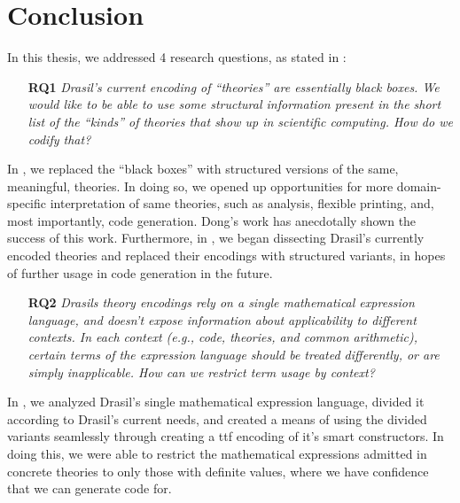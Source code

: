 \chapter{Conclusion}
\label{chap:conclusion}

In this thesis, we addressed 4 research questions, as stated in
:

\begin{enumerate}

    \item[\textbf{RQ1}] \textit{Drasil's current encoding of ``theories'' are
          essentially black boxes. We would like to be able to use some
          structural information present in the short list of the ``kinds'' of
          theories that show up in scientific computing. How do we codify that?}

\end{enumerate}

In , we replaced the ``black boxes'' with structured
versions of the same, meaningful, theories. In doing so, we opened up
opportunities for more domain-specific interpretation of same theories, such as
analysis, flexible printing, and, most importantly, code generation. Dong's work
\cite{Chen2022MEng} has anecdotally shown the success of this work. Furthermore,
in , we began dissecting Drasil's currently encoded
theories and replaced their encodings with structured variants, in hopes of
further usage in code generation in the future.

\begin{enumerate}
    
    \item[\textbf{RQ2}] \textit{Drasils theory encodings rely on a single
          mathematical expression language, and doesn't expose information about
          applicability to different contexts. In each context (e.g., code,
          theories, and common arithmetic), certain terms of the expression
          language should be treated differently, or are simply inapplicable.
          How can we restrict term usage by context?}

\end{enumerate}

In , we analyzed Drasil's single mathematical
expression language, divided it according to Drasil's current needs, and created
a means of using the divided variants seamlessly through creating a \acs{ttf}
encoding of it's smart constructors. In doing this, we were able to restrict the
mathematical expressions admitted in concrete theories to only those with
definite values, where we have confidence that we can generate code for.

